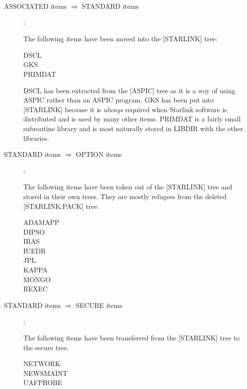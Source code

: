 \begin{description}
\begin{description}

\item [ASSOCIATED items $\Longrightarrow$ STANDARD items] :

The following items have been moved into the [STARLINK] tree:

\begin{description}
\begin{description}
\item [DSCL]
\item [GKS]
\item [PRIMDAT]
\end{description}
\end{description}
DSCL has been extracted from the [ASPIC] tree as it is a way of using ASPIC
rather than an ASPIC program.
GKS has been put into [STARLINK] because it is {\em always} required when
Starlink software is distributed and is used by many other items.
PRIMDAT is a fairly small subroutine library and is most naturally stored in
LIBDIR with the other libraries.

\item [STANDARD items $\Longrightarrow$ OPTION items] :

The following items have been taken out of the [STARLINK] tree and stored in
their own trees.
They are mostly refugees from the deleted [STARLINK.PACK] tree.
\begin{description}
\begin{description}
\item [ADAMAPP]
\item [DIPSO]
\item [IRAS]
\item [IUEDR]
\item [JPL]
\item [KAPPA]
\item [MONGO]
\item [REXEC]
\end{description}
\end{description}

\item [STANDARD items $\Longrightarrow$ SECURE items] :

The following items have been transferred from the [STARLINK] tree to the secure
tree.
\begin{description}
\begin{description}
\item [NETWORK]
\item [NEWSMAINT]
\item [UAFPROBE]
\end{description}
\end{description}


\end{description}
\end{description}
